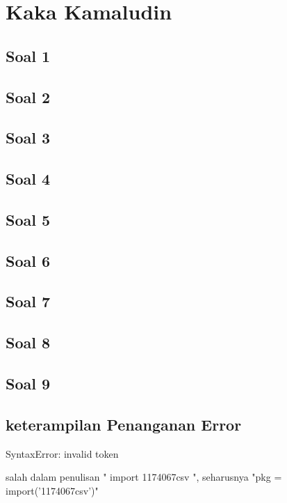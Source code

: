 \section{Kaka Kamaludin}
\subsection{Soal 1}

\subsection{Soal 2}

\subsection{Soal 3}

\subsection{Soal 4}

\subsection{Soal 5}

\subsection{Soal 6}

\subsection{Soal 7}

\subsection{Soal 8}

\subsection{Soal 9}

\subsection{keterampilan Penanganan Error}

SyntaxError: invalid token

salah dalam penulisan " import 1174067\textunderscore csv ", seharusnya "pkg = \textunderscore \textunderscore import\textunderscore \textunderscore('1174067\textunderscore csv')"
